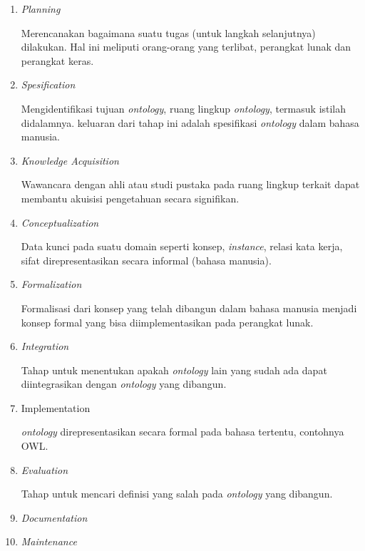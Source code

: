 \begin{enumerate}
	\item \textit{Planning}
		\par Merencanakan bagaimana suatu tugas (untuk langkah selanjutnya) dilakukan. Hal ini meliputi orang-orang yang terlibat, perangkat lunak dan perangkat keras.
	\item \textit{Spesification} 
		\par Mengidentifikasi tujuan \textit{ontology}, ruang lingkup \textit{ontology}, termasuk istilah didalamnya. keluaran dari tahap ini adalah spesifikasi \textit{ontology} dalam bahasa manusia.
	\item \textit{Knowledge Acquisition}
		\par Wawancara dengan ahli atau studi pustaka pada ruang lingkup terkait dapat membantu akuisisi pengetahuan secara signifikan.
	\item \textit{Conceptualization}  
		\par Data kunci pada suatu domain seperti konsep, \textit{instance}, relasi kata kerja, sifat direpresentasikan secara informal (bahasa manusia).
	\item \textit{Formalization}
		\par Formalisasi dari konsep yang telah dibangun dalam bahasa manusia menjadi konsep formal yang bisa diimplementasikan pada perangkat lunak.
	\item \textit{Integration} 
		\par Tahap untuk menentukan apakah \textit{ontology} lain yang sudah ada dapat diintegrasikan dengan \textit{ontology} yang dibangun.
	\item {Implementation} 
		\par \textit{ontology} direpresentasikan secara formal pada bahasa tertentu, contohnya OWL. 
	\item \textit{Evaluation} 
		\par Tahap untuk mencari definisi yang salah pada \textit{ontology} yang dibangun.
	\item \textit{Documentation}
	\item \textit{Maintenance}
\end{enumerate}

